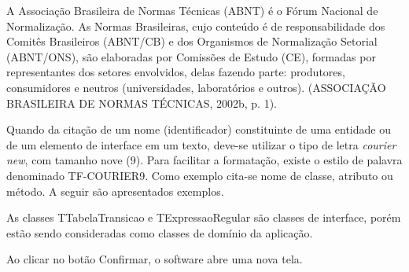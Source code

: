 A Associação Brasileira de Normas Técnicas (ABNT) é o Fórum Nacional de
Normalização. As Normas Brasileiras, cujo conteúdo é de responsabilidade
dos Comitês Brasileiros (ABNT/CB) e dos Organismos de Normalização
Setorial (ABNT/ONS), são elaboradas por Comissões de Estudo (CE),
formadas por representantes dos setores envolvidos, delas fazendo parte:
produtores, consumidores e neutros (universidades, laboratórios e
outros). (ASSOCIAÇÃO BRASILEIRA DE NORMAS TÉCNICAS, 2002b, p. 1).

Quando da citação de um nome (identificador) constituinte de uma
entidade ou de um elemento de interface em um texto, deve-se utilizar o
tipo de letra \emph{courier new}, com tamanho nove (9). Para facilitar a
formatação, existe o estilo de palavra denominado TF-COURIER9. Como
exemplo cita-se nome de classe, atributo ou método. A seguir são
apresentados exemplos.

As classes TTabelaTransicao e TExpressaoRegular são classes de
interface, porém estão sendo consideradas como classes de domínio da
aplicação.

Ao clicar no botão Confirmar, o software abre uma nova tela.
